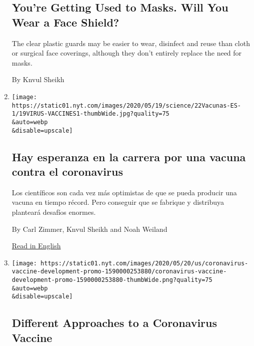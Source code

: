 \begin{enumerate}
  \hypertarget{youre-getting-used-to-masks-will-you-wear-a-face-shield}{%
  \subsection{You're Getting Used to Masks. Will You Wear a Face
  Shield?}\label{youre-getting-used-to-masks-will-you-wear-a-face-shield}}

  The clear plastic guards may be easier to wear, disinfect and reuse
  than cloth or surgical face coverings, although they don't entirely
  replace the need for masks.

  By Knvul Sheikh
\item
  \href{/es/2020/05/22/espanol/ciencia-y-tecnologia/vacuna-coronavirus.html}{}

  \texttt{[image: https://static01.nyt.com/images/2020/05/19/science/22Vacunas-ES-1/19VIRUS-VACCINES1-thumbWide.jpg?quality=75\\\&auto=webp\\\&disable=upscale]}

  \hypertarget{hay-esperanza-en-la-carrera-por-una-vacuna-contra-el-coronavirus}{%
  \subsection{Hay esperanza en la carrera por una vacuna contra el
  coronavirus}\label{hay-esperanza-en-la-carrera-por-una-vacuna-contra-el-coronavirus}}

  Los científicos son cada vez más optimistas de que se pueda producir
  una vacuna en tiempo récord. Pero conseguir que se fabrique y
  distribuya planteará desafíos enormes.

  By Carl Zimmer, Knvul Sheikh and Noah Weiland

  \href{https://www.nytimes.com/2020/05/20/health/coronavirus-vaccines.html}{Read
  in English}
\item
  \href{/interactive/2020/05/20/science/coronavirus-vaccine-development.html}{}

  \texttt{[image: https://static01.nyt.com/images/2020/05/20/us/coronavirus-vaccine-development-promo-1590000253880/coronavirus-vaccine-development-promo-1590000253880-thumbWide.png?quality=75\\\&auto=webp\\\&disable=upscale]}

  \hypertarget{different-approaches-to-a-coronavirus-vaccine}{%
  \subsection{Different Approaches to a Coronavirus
  Vaccine}\label{different-approaches-to-a-coronavirus-vaccine}}


\end{enumerate}
